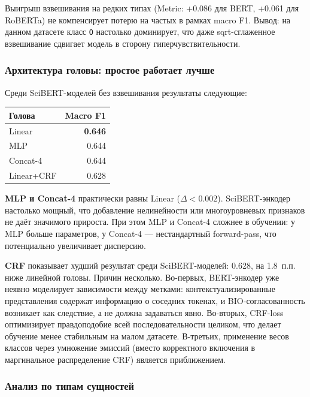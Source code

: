 Выигрыш взвешивания на редких типах (Metric: +0.086 для BERT, +0.061 для RoBERTa) не компенсирует потерю на частых в рамках macro F1. Вывод: на данном датасете класс \texttt{O} настолько доминирует, что даже sqrt-сглаженное взвешивание сдвигает модель в сторону гиперчувствительности.

\subsubsection{Архитектура головы: простое работает лучше}

Среди SciBERT-моделей без взвешивания результаты следующие:

\begin{center}
\begin{tabular}{lr}
\toprule
Голова & Macro F1 \\
\midrule
Linear      & \textbf{0.646} \\
MLP         & 0.644 \\
Concat-4    & 0.644 \\
Linear+CRF  & 0.628 \\
\bottomrule
\end{tabular}
\end{center}

\textbf{MLP и Concat-4} практически равны Linear ($\Delta < 0.002$). SciBERT-энкодер настолько мощный, что добавление нелинейности или многоуровневых признаков не даёт значимого прироста. При этом MLP и Concat-4 сложнее в обучении: у MLP больше параметров, у Concat-4 --- нестандартный forward-pass, что потенциально увеличивает дисперсию.

\textbf{CRF} показывает худший результат среди SciBERT-моделей: 0.628, на 1.8~п.п. ниже линейной головы. Причин несколько. Во-первых, BERT-энкодер уже неявно моделирует зависимости между метками: контекстуализированные представления содержат информацию о соседних токенах, и BIO-согласованность возникает как следствие, а не должна задаваться явно. Во-вторых, CRF-loss оптимизирует правдоподобие всей последовательности целиком, что делает обучение менее стабильным на малом датасете. В-третьих, применение весов классов через умножение эмиссий (вместо корректного включения в маргинальное распределение CRF) является приближением.

\subsubsection{Анализ по типам сущностей}

